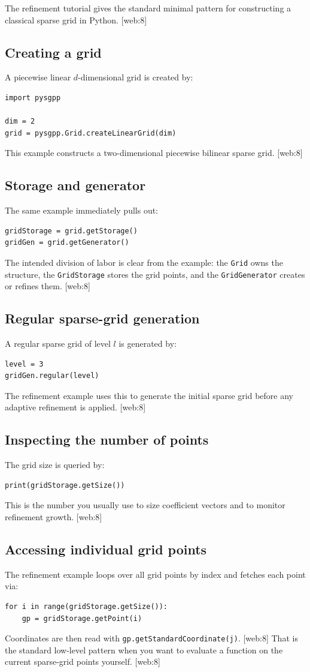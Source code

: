 \documentclass[11pt,a4paper]{article}
\begin{document}
The refinement tutorial gives the standard minimal pattern for constructing a classical sparse grid in Python. [web:8]

\subsection{Creating a grid}
A piecewise linear \(d\)-dimensional grid is created by:
\begin{lstlisting}[style=py]
import pysgpp

dim = 2
grid = pysgpp.Grid.createLinearGrid(dim)
\end{lstlisting}
This example constructs a two-dimensional piecewise bilinear sparse grid. [web:8]  

\subsection{Storage and generator}
The same example immediately pulls out:
\begin{lstlisting}[style=py]
gridStorage = grid.getStorage()
gridGen = grid.getGenerator()
\end{lstlisting}
The intended division of labor is clear from the example: the \texttt{Grid} owns the structure, the \texttt{GridStorage} stores the grid points, and the \texttt{GridGenerator} creates or refines them. [web:8]  

\subsection{Regular sparse-grid generation}
A regular sparse grid of level \(l\) is generated by:
\begin{lstlisting}[style=py]
level = 3
gridGen.regular(level)
\end{lstlisting}
The refinement example uses this to generate the initial sparse grid before any adaptive refinement is applied. [web:8]  

\subsection{Inspecting the number of points}
The grid size is queried by:
\begin{lstlisting}[style=py]
print(gridStorage.getSize())
\end{lstlisting}
This is the number you usually use to size coefficient vectors and to monitor refinement growth. [web:8]  

\subsection{Accessing individual grid points}
The refinement example loops over all grid points by index and fetches each point via:
\begin{lstlisting}[style=py]
for i in range(gridStorage.getSize()):
    gp = gridStorage.getPoint(i)
\end{lstlisting}
Coordinates are then read with \texttt{gp.getStandardCoordinate(j)}. [web:8]  
That is the standard low-level pattern when you want to evaluate a function on the current sparse-grid points yourself. [web:8]  
\end{document}
